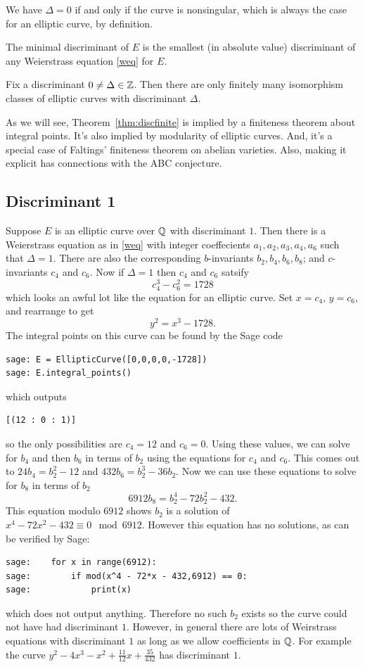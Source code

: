 \documentclass{book}
\begin{document}
We have $\Delta=0$ if and only if the curve is nonsingular, which is
always the case for an elliptic curve, by definition.

\begin{definition}
The minimal discriminant of $E$ is the smallest (in absolute
value) discriminant of any Weierstrass equation \eqref{weq}
for $E$.
\end{definition}


\begin{theorem}\label{thm:discfinite}
Fix a discriminant $0\neq \Delta\in\mathbb{Z}$.
Then there are only finitely many isomorphism classes
of elliptic curves with discriminant $\Delta$.
\end{theorem}
As we will see, Theorem~\ref{thm:discfinite} is
implied by a finiteness theorem about integral
points.  It's also implied by modularity of elliptic curves.
And, it's a special case of Faltings' finiteness
theorem on abelian varieties. Also, making it explicit
has connections with the ABC conjecture.

\subsection{Discriminant 1} %
Suppose $E$ is an elliptic curve over $\mathbb{Q}$ with discriminant $1$.
Then there is a Weierstrass equation as in \eqref{weq}
with integer coeffecients $a_1,a_2,a_3,a_4,a_6$ such that $\Delta=1$.
There are also the corresponding $b$-invariants
$b_2,b_4,b_6,b_8$; and $c$-invariants $c_4$ and $c_6$.
Now if $\Delta=1$ then $c_4$ and $c_6$ satsify
$$
c_4^3 - c_6^2 = 1728
$$
which looks an awful lot like the equation for an
elliptic curve. Set $x = c_4$, $y = c_6$, and
rearrange to get
$$
y^2 = x^3 - 1728.
$$
The integral points on this curve can be
found by the Sage code
\begin{lstlisting}
sage: E = EllipticCurve([0,0,0,0,-1728])
sage: E.integral_points()
\end{lstlisting}
which outputs
\begin{lstlisting}
[(12 : 0 : 1)]
\end{lstlisting}
so the only possibilities are $c_4 = 12$ and
$c_6 = 0$. Using these values, we can solve for $b_4$ and then
$b_6$ in terms of $b_2$ using the equations for $c_4$
and $c_6$. This comes out to $24 b_4 = b_2^2 - 12$
and $432 b_6 = b_2^3 - 36 b_2$.
Now we can use these equations to solve for $b_8$ in
terms of $b_2$
$$
    6912 b_8 = b_2^4 - 72 b_2^2 - 432.
$$
This equation modulo $6912$ shows $b_2$ is a
solution of $x^4 - 72x^2 - 432 \equiv 0 \mod{6912}$. However this
equation has no solutions, as can be  verified by Sage:
\begin{lstlisting}
sage:    for x in range(6912):
sage:        if mod(x^4 - 72*x - 432,6912) == 0:
sage:            print(x)
\end{lstlisting}
which does not output anything. Therefore no such $b_2$ exists so the curve could not have had discriminant $1$. However, in general there are lots of Weirstrass equations with discriminant $1$ as long as we allow coefficients in $\mathbb{Q}$. For example the curve $y^2 - 4x^3 - x^2 + \frac{11}{12}x + \frac{35}{432}$ has discriminant $1$.
\end{document}
